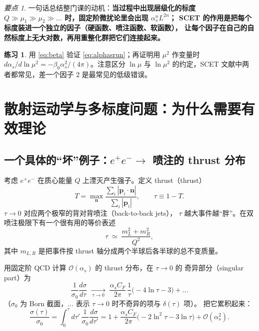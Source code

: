 \documentclass[UTF8,a4paper,11pt]{ctexart}
\theoremstyle{definition}
\newtheorem{exercise}{练习}[section]
\theoremstyle{remark}
\newtheorem{keypoint}{要点}[section]
\theoremstyle{plain}
\newcommand{\as}{\alpha_s}
\newcommand{\CF}{C_F}
\newcommand{\en}[1]{\textsf{#1}}   %
\begin{document}
\begin{keypoint}
一句话总结整门课的动机：\textbf{当过程中出现层级化的标度
$Q\gg\mu_1\gg\mu_2\gg\dots$ 时，固定阶微扰论里会出现 $\as^nL^{2n}$；
SCET 的作用是把每个标度装进一个独立的因子（硬函数、喷注函数、软函数），
让每个因子在自己的自然标度上无大对数，再用重整化群把它们连接起来。}
\end{keypoint}

\begin{exercise}
用 \eqref{eq:beta} 验证 \eqref{eq:alphasrun}；再证明用 $\mu^2$ 作变量时
$d\as/d\ln\mu^2=-\beta_0\as^2/(4\pi)$。注意区分 $\ln\mu$ 与 $\ln\mu^2$
的约定，SCET 文献中两者都常见，差一个因子 2 是最常见的低级错误。
\end{exercise}

\section{散射运动学与多标度问题：为什么需要有效理论}
\label{sec:multiscale}

\subsection{一个具体的“坏”例子：$e^+e^-\to$ 喷注的 thrust 分布}
\label{subsec:thrustintro}

考虑 $e^+e^-$ 在质心能量 $Q$ 上湮灭产生强子。定义 thrust（\en{thrust}）
\begin{equation}
  T=\max_{\bm n}\frac{\sum_i|\bm p_i\cdot\bm n|}{\sum_i|\bm p_i|},
  \qquad \tau\equiv 1-T .
  \label{eq:thrustdef}
\end{equation}
$\tau\to0$ 对应两个极窄的背对背喷注（\en{back-to-back jets}），
$\tau$ 越大事件越“胖”。在双喷注极限下有一个很有用的等价表述
\begin{equation}
  \tau\;\simeq\;\frac{m_L^2+m_R^2}{Q^2},
  \label{eq:thrusthemisphere}
\end{equation}
其中 $m_{L,R}$ 是把事件按 thrust 轴分成两个半球后各半球的总不变质量。

用固定阶 QCD 计算 $\mathcal O(\as)$ 的 thrust 分布，在 $\tau\to0$ 的
奇异部分（\en{singular part}）为
\begin{equation}
  \frac{1}{\sigma_0}\frac{d\sigma}{d\tau}
  \;\xrightarrow[\ \tau\to0\ ]{}\;
  \frac{\as \CF}{2\pi}\,\frac{1}{\tau}
  \Big(-4\ln\tau-3\Big)+\dots
  \label{eq:thrustfixed}
\end{equation}
（$\sigma_0$ 为 Born 截面，$\dots$ 表示 $\tau\to0$ 时不奇异的项与 $\delta(\tau)$ 项）。
把它累积起来：
\begin{equation}
  \frac{\sigma(\tau)}{\sigma_0}
  =\int_0^\tau\! d\tau'\,\frac{1}{\sigma_0}\frac{d\sigma}{d\tau'}
  =1+\frac{\as\CF}{2\pi}\Big(-2\ln^2\tau-3\ln\tau\Big)+\mathcal O(\as^2).
  \label{eq:thrustcumul}
\end{equation}
\end{document}
